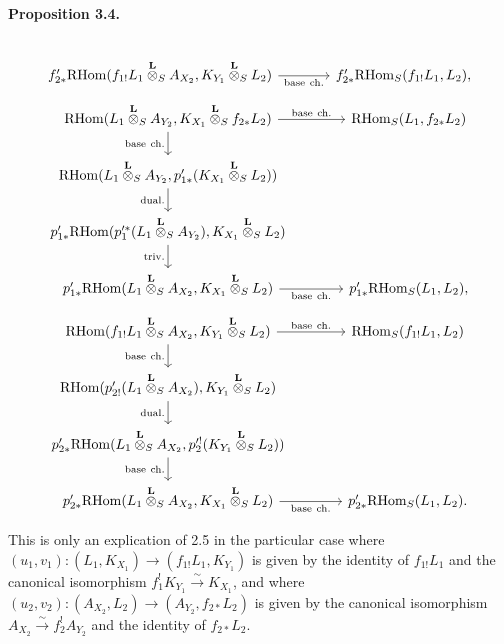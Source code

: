 \documentclass[11pt]{article}
\newenvironment{statement}[1]{\par\medskip\noindent\textbf{#1.}\ }{\par\medskip}
\providecommand{\RHom}{\mathrm{RHom}}
\providecommand{\RHom}{\mathrm{RHom}}
\providecommand{\RHom}{\mathrm R\mathcal{H}om}
\begin{document}
\begin{statement}{Proposition 3.4}
\[\begin{tikzcd}[column sep=3.7em,row sep=1.7em]
& \\
f'_{2*}\RHom(f_{1!}L_1\overset{\mathbf L}{\otimes}_S A_{X_2},K_{Y_1}\overset{\mathbf L}{\otimes}_S L_2) \arrow[r,"\mathrm{base\ ch.}"']
& f'_{2*}\RHom_S(f_{1!}L_1,L_2),
\end{tikzcd}
\]
\[
\begin{tikzcd}[column sep=3.7em,row sep=1.7em]
\RHom(L_1\overset{\mathbf L}{\otimes}_S A_{Y_2},K_{X_1}\overset{\mathbf L}{\otimes}_S f_{2*}L_2)
  \arrow[r,"\mathrm{base\ ch.}"] \arrow[d,"\mathrm{base\ ch.}"']
& \RHom_S(L_1,f_{2*}L_2)  \\
\RHom(L_1\overset{\mathbf L}{\otimes}_S A_{Y_2},p'_{1*}(K_{X_1}\overset{\mathbf L}{\otimes}_S L_2)) \arrow[d,"\mathrm{dual.}"']
& \\
p'_{1*}\RHom(p_1'^*(L_1\overset{\mathbf L}{\otimes}_S A_{Y_2}),K_{X_1}\overset{\mathbf L}{\otimes}_S L_2) \arrow[d,"\mathrm{triv.}"']
& \\
p'_{1*}\RHom(L_1\overset{\mathbf L}{\otimes}_S A_{X_2},K_{X_1}\overset{\mathbf L}{\otimes}_S L_2) \arrow[r,"\mathrm{base\ ch.}"']
& p'_{1*}\RHom_S(L_1,L_2),
\end{tikzcd}
\]
\[
\begin{tikzcd}[column sep=3.7em,row sep=1.7em]
\RHom(f_{1!}L_1\overset{\mathbf L}{\otimes}_S A_{X_2},K_{Y_1}\overset{\mathbf L}{\otimes}_S L_2)
  \arrow[r,"\mathrm{base\ ch.}"] \arrow[d,"\mathrm{base\ ch.}"']
& \RHom_S(f_{1!}L_1,L_2)  \\
\RHom(p'_{2!}(L_1\overset{\mathbf L}{\otimes}_S A_{X_2}),K_{Y_1}\overset{\mathbf L}{\otimes}_S L_2) \arrow[d,"\mathrm{dual.}"']
& \\
p'_{2*}\RHom(L_1\overset{\mathbf L}{\otimes}_S A_{X_2},p_2'^!(K_{Y_1}\overset{\mathbf L}{\otimes}_S L_2)) \arrow[d,"\mathrm{base\ ch.}"']
& \\
p'_{2*}\RHom(L_1\overset{\mathbf L}{\otimes}_S A_{X_2},K_{X_1}\overset{\mathbf L}{\otimes}_S L_2) \arrow[r,"\mathrm{base\ ch.}"']
& p'_{2*}\RHom_S(L_1,L_2).
\end{tikzcd}
\]
\end{statement}
This is only an explication of 2.5 in the particular case where $(u_1,v_1):(L_1,K_{X_1})\to(f_{1!}L_1,K_{Y_1})$ is given by the identity of $f_{1!}L_1$ and the canonical isomorphism $f_1^!K_{Y_1}\xrightarrow{\sim}K_{X_1}$, and where $(u_2,v_2):(A_{X_2},L_2)\to(A_{Y_2},f_{2*}L_2)$ is given by the canonical isomorphism $A_{X_2}\xrightarrow{\sim}f_2^!A_{Y_2}$ and the identity of $f_{2*}L_2$.
\end{document}
